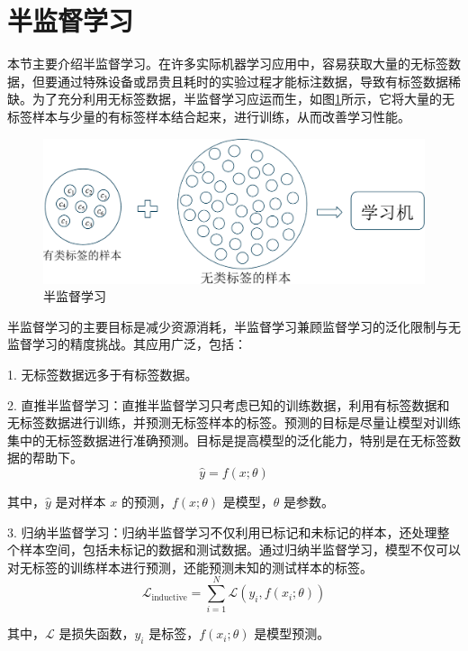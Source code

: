 \documentclass[promaster]{thesis-uestc}
\begin{document}
\section{半监督学习}
本节主要介绍半监督学习。在许多实际机器学习应用中，容易获取大量的无标签数据，但要通过特殊设备或昂贵且耗时的实验过程才能标注数据，导致有标签数据稀缺。为了充分利用无标签数据，半监督学习应运而生，如图\ref{halfSupervised}所示，它将大量的无标签样本与少量的有标签样本结合起来，进行训练，从而改善学习性能。
\begin{figure}[h!]
    \centering
    \includegraphics[width=1\linewidth]{./pic/semi-supervision.pdf}
    \caption{半监督学习}
    \label{halfSupervised}
\end{figure}

半监督学习的主要目标是减少资源消耗，半监督学习兼顾监督学习的泛化限制与无监督学习的精度挑战。其应用广泛，包括：

1. 无标签数据远多于有标签数据。

2. 直推半监督学习：直推半监督学习只考虑已知的训练数据，利用有标签数据和无标签数据进行训练，并预测无标签样本的标签。预测的目标是尽量让模型对训练集中的无标签数据进行准确预测。目标是提高模型的泛化能力，特别是在无标签数据的帮助下。
\begin{equation}
\hat{y} = f(x; \theta)
\end{equation}

其中，\( \hat{y} \) 是对样本 \( x \) 的预测，\( f(x; \theta) \) 是模型，\( \theta \) 是参数。

3. 归纳半监督学习：归纳半监督学习不仅利用已标记和未标记的样本，还处理整个样本空间，包括未标记的数据和测试数据。通过归纳半监督学习，模型不仅可以对无标签的训练样本进行预测，还能预测未知的测试样本的标签。
\begin{equation}
\mathcal{L}_{\text{inductive}} = \sum_{i=1}^{N} \mathcal{L}(y_i, f(x_i; \theta))
\end{equation}

其中，\( \mathcal{L} \) 是损失函数，\( y_i \) 是标签，\( f(x_i; \theta) \) 是模型预测。
\end{document}
